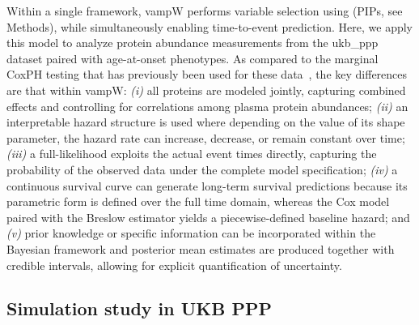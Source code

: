 Within a single framework, vampW performs variable selection using  (PIPs, see Methods), while simultaneously enabling time-to-event prediction. Here, we apply this model to analyze protein abundance measurements from the \acrfull{ukb_ppp} dataset \cite{sun_plasma_2023} paired with age-at-onset phenotypes. As compared to the marginal CoxPH testing that has previously been used for these data~\cite{gadd_blood_2024,gong_unraveling_2025,deng_atlas_2025}, the key differences are that within vampW: \textit{(i)} all proteins are modeled jointly, capturing combined effects and controlling for correlations among plasma protein abundances; \textit{(ii)} an interpretable hazard structure is used where depending on the value of its shape parameter, the hazard rate can increase, decrease, or remain constant over time; \textit{(iii)} a full-likelihood exploits the actual event times directly, capturing the probability of the observed data under the complete model specification; \textit{(iv)} a continuous survival curve can generate long-term survival predictions because its parametric form is defined over the full time domain, whereas the Cox model paired with the Breslow estimator yields a piecewise-defined baseline hazard; and \textit{(v)} prior knowledge or specific information can be incorporated within the Bayesian framework and posterior mean estimates are produced together with credible intervals, allowing for explicit quantification of uncertainty.


\subsection{Simulation study in UKB PPP}
\label{sim_ukb_ppp}

